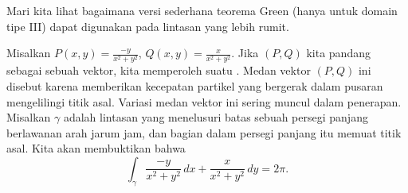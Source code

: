 Mari kita lihat bagaimana versi sederhana teorema Green (hanya untuk domain
tipe III) dapat digunakan pada lintasan yang lebih rumit.

\begin{example}
Misalkan $P(x,y) = \frac{-y}{x^2+y^2}$, 
$Q(x,y) = \frac{x}{x^2+y^2}$. Jika $(P,Q)$ kita pandang sebagai sebuah vektor,
kita memperoleh suatu \emph{}. Medan vektor $(P,Q)$ ini disebut
\emph{} karena memberikan kecepatan partikel
yang bergerak dalam pusaran mengelilingi titik asal. Variasi medan vektor ini
sering muncul dalam penerapan.
Misalkan $\gamma$ adalah lintasan yang menelusuri batas sebuah persegi panjang
berlawanan arah jarum jam, dan bagian dalam persegi panjang itu memuat titik asal.
Kita akan membuktikan bahwa
\begin{equation*}
\int_{\gamma} \frac{-y}{x^2+y^2} \, dx + \frac{x}{x^2+y^2} \, dy = 2 \pi .
\end{equation*}


\end{example}
